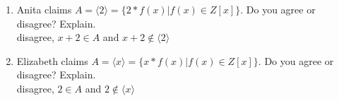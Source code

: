 \documentclass{article}
\newcommand{\Z}{\mathbb{Z}}
\begin{document}
\begin{enumerate}
\begin{enumerate}
\begin{proof}
			let $t(x) = xg(x)+ n$ for some  $g(x) \in \Z[x]$ and $n \in \Z$.
			Now Consider, 
			\begin{align*}
				t(x)f_1(x)  &= (xg(x)+ n)(xg_1(x)+2n_1) \\
							&=x(xg(x)g_1(x)+2n_1g(x)+ng_1(x))+ 2n_1n
			\end{align*}
			This show that A satisfies the absorption property and closure under multiplication.
			Therefore A is an ideal.
		\end{proof}
		\item Anita claims $A = \langle2\rangle =\{ 2*f(x)| f(x) \in Z[x] \}$. Do you agree or
		disagree? Explain.\\
		disagree, $x+2 \in A$ and $x+2 \not\in \langle2\rangle$

		\item Elizabeth claims $A = \langle x \rangle =\{ x*f(x)| f(x) \in Z[x] \}$. Do you agree or
		disagree? Explain.\\
		disagree, $2 \in A$ and $2 \not\in \langle x \rangle$ 
	\end{enumerate}



	\end{enumerate}
\end{document}
